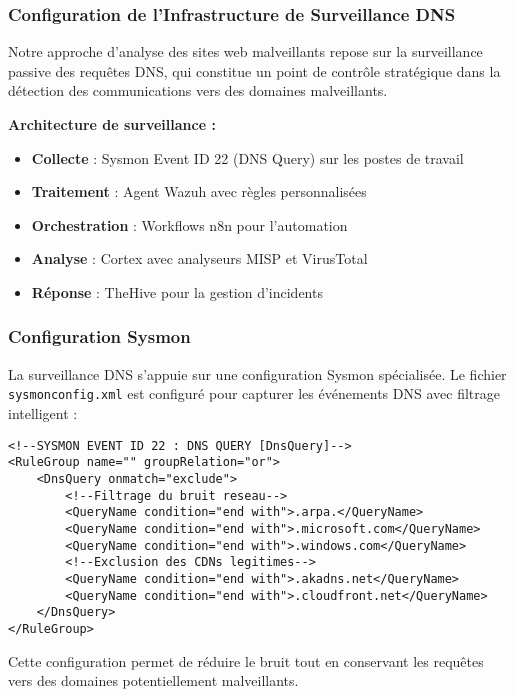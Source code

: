 \subsubsection{Configuration de l'Infrastructure de Surveillance DNS}

Notre approche d'analyse des sites web malveillants repose sur la surveillance passive des requêtes DNS, qui constitue un point de contrôle stratégique dans la détection des communications vers des domaines malveillants.

\textbf{Architecture de surveillance :}
\begin{itemize}
    \item \textbf{Collecte} : Sysmon Event ID 22 (DNS Query) sur les postes de travail
    \item \textbf{Traitement} : Agent Wazuh avec règles personnalisées
    \item \textbf{Orchestration} : Workflows n8n pour l'automation
    \item \textbf{Analyse} : Cortex avec analyseurs MISP et VirusTotal
    \item \textbf{Réponse} : TheHive pour la gestion d'incidents
\end{itemize}

\subsubsection{Configuration Sysmon}

La surveillance DNS s'appuie sur une configuration Sysmon spécialisée. Le fichier \texttt{sysmonconfig.xml} est configuré pour capturer les événements DNS avec filtrage intelligent :
\newpage
\begin{lstlisting}[style=XMLStyle, caption=Configuration Sysmon pour DNS, label=lst:sysmon-dns]
<!--SYSMON EVENT ID 22 : DNS QUERY [DnsQuery]-->
<RuleGroup name="" groupRelation="or">
    <DnsQuery onmatch="exclude">
        <!--Filtrage du bruit reseau-->
        <QueryName condition="end with">.arpa.</QueryName>
        <QueryName condition="end with">.microsoft.com</QueryName>
        <QueryName condition="end with">.windows.com</QueryName>
        <!--Exclusion des CDNs legitimes-->
        <QueryName condition="end with">.akadns.net</QueryName>
        <QueryName condition="end with">.cloudfront.net</QueryName>
    </DnsQuery>
</RuleGroup>
\end{lstlisting}

Cette configuration permet de réduire le bruit tout en conservant les requêtes vers des domaines potentiellement malveillants.

